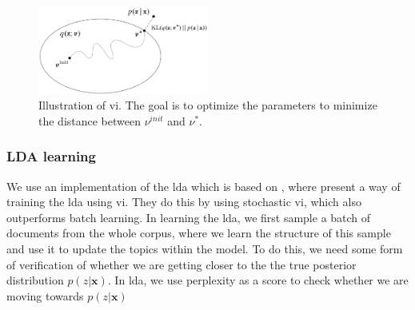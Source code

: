 \begin{figure}
	\centering
	\includegraphics[width=0.5\textwidth]{figures/vi_illustration.png}
	\caption[Caption for LOF]{Illustration of \acrlong{vi}\footnotemark. The goal is to optimize the parameters to minimize the distance between $\nu^{init}$ and $\nu^*$.}
	\label{fig:vi}
\end{figure}

\subsubsection*{LDA learning}
We use an implementation of the \gls{lda} which is based on \cite{blei2010online}, where \citeauthor{blei2010online} present a way of training the \gls{lda} using \gls{vi}.
They do this by using stochastic \gls{vi}, which also outperforms batch learning.
In learning the \gls{lda}, we first sample a batch of documents from the whole corpus, where we learn the structure of this sample and use it to update the topics within the model.
To do this, we need some form of verification of whether we are getting closer to the the true posterior distribution $p(z|\textbf{x})$.
In \gls{lda}, we use perplexity as a score to check whether we are moving towards $p(z|\textbf{x})$
